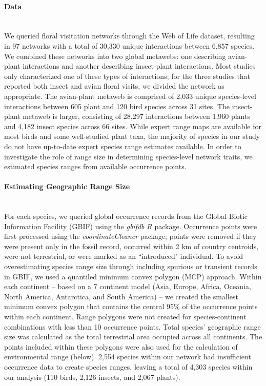 \paragraph*{Data}\mbox{}\\ 
We queried floral visitation networks through the Web of Life dataset, resulting in 97 networks with a total of 30,330 unique interactions between 6,857 species. We combined these networks into two global metawebs: one describing avian-plant interactions and another describing insect-plant interactions. Most studies only characterized one of these types of interactions; for the three studies that reported both insect and avian floral visits, we divided the network as appropriate. The avian-plant metaweb is comprised of 2,033 unique species-level interactions between 605 plant and 120 bird species across 31 sites. The insect-plant metaweb is larger, consisting of 28,297 interactions between 1,960 plants and 4,182 insect species across 66 sites. While expert range maps are available for most birds and some well-studied plant taxa, the majority of species in our study do not have up-to-date expert species range estimates available. In order to investigate the role of range size in determining species-level network traits, we estimated species ranges from available occurrence points. 

\paragraph*{Estimating Geographic Range Size}\mbox{}\\ 
For each species, we queried global occurrence records from the Global Biotic Information Facility (GBIF) using the \textit{gbifdb} $R$ package. Occurrence points were first processed using the \textit{coordinateCleaner} package; points were removed if they were present only in the fossil record, occurred within 2 km of country centroids, were not terrestrial, or were marked as an ``introduced" individual. To avoid overestimating species range size through including spurious or transient records in GBIF, we used a quantiled minimum convex polygon (MCP) approach. Within each continent -- based on a 7 continent model (Asia, Europe, Africa, Oceania, North America, Antarctica, and South America) -- we created the smallest minimum convex polygon that contains the central 95\% of the occurrence points within each continent. Range polygons were not created for species-continent combinations with less than 10 occurrence points. Total species' geographic range size was calculated as the total terrestrial area occupied across all continents. The points included within these polygons were also used for the calculation of environmental range (below). 2,554 species within our network had insufficient occurrence data to create species ranges, leaving a total of 4,303 species within our analysis (110 birds, 2,126 insects, and 2,067 plants). 


